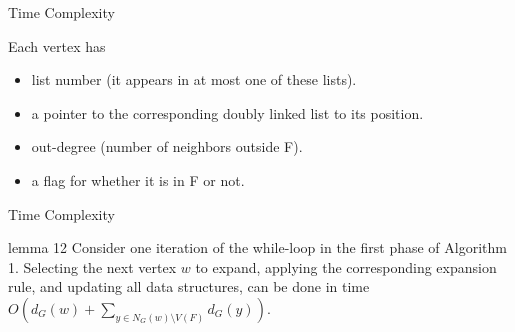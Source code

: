 \documentclass{beamer}
\begin{document}
\begin{frame}{Time Complexity}
    \begin{exampleblock}{Each vertex has}
        \begin{itemize}
            \item list number (it appears in at most one of these lists).
            \item a pointer to the corresponding doubly linked list to its position.
            \item out-degree (number of neighbors outside F).
            \item a flag for whether it is in F or not.
        \end{itemize}
    \end{exampleblock}
\end{frame}


\begin{frame}{Time Complexity}
    \begin{exampleblock}{lemma 12}
        Consider one iteration of the while-loop in the first phase of Algorithm 1.
Selecting the next vertex $w$ to expand, applying the corresponding expansion rule, and updating all data structures, can be done in time $O(d_{G}(w) + \sum_{y \in N_G(w) \setminus V(F)} d_{G}(y))$.
    \end{exampleblock}
\end{frame}
\end{document}
